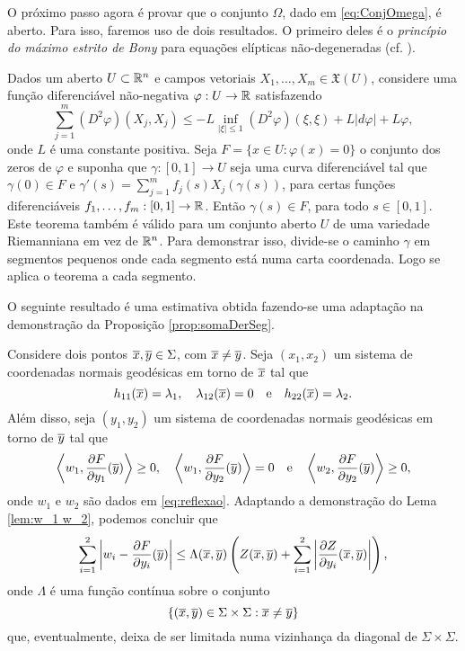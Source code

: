 O pr\'oximo passo agora \'e provar que o conjunto $\Omega$,
dado em \eqref{eq:ConjOmega}, \'e aberto. Para isso, faremos
uso de dois resultados. O primeiro deles \'e o {\em princ\'ipio
do m\'aximo estrito de Bony} para equa\c c\~oes el\'ipticas 
n\~ao-degeneradas (cf. \cite[Corollary 9.7]{Brendle2010}).

\begin{teorema} \label{teo:bony}
Dados um aberto $U\subset\mathbb{R}^n$ e campos vetoriais 
$X_1,\ldots,X_m\in\mathfrak{X}(U)$, considere uma fun\c c\~ao
diferenci\'avel n\~ao-negativa $\varphi:U\to\mathbb{R}$ satisfazendo
\begin{equation}\label{eq:bony}
\sum_{j=1}^{m} (D^2 \varphi)(X_j,X_j) \leq -L \inf_{|\xi| \leq 1} 
(D^2 \varphi)(\xi,\xi) + L |d \varphi| + L \varphi,
\end{equation}
onde $L$ é uma constante positiva. Seja $F=\{x\in U:\varphi(x)=0\}$
o conjunto dos zeros de $\varphi$ e suponha que $\gamma:[0,1]\to U$
seja uma curva diferenciável tal que $\gamma(0)\in F$ e 
$\gamma'(s) = \displaystyle\sum_{j=1}^{m} f_j(s) X_j(\gamma(s))$, para certas
funções diferenciáveis $f_1,\ldots,f_m:[0,1]\to\mathbb{R}$. Então 
$\gamma(s)\in F$, para todo $s\in[0,1]$.
Este teorema também é válido para um conjunto aberto $U$ de uma variedade Riemanniana em vez de $\mathbb{R}^n$. Para demonstrar isso, divide-se o caminho $\gamma$ em segmentos pequenos onde cada segmento está numa carta coordenada. Logo se aplica o teorema a cada segmento.
\end{teorema}

O seguinte resultado \'e uma estimativa obtida fazendo-se uma
adapta\c c\~ao na demonstra\c c\~ao da Proposi\c c\~ao
\ref{prop:somaDerSeg}.

Considere dois pontos $\overline{x},\overline{y}\in\Sigma$, com $\overline{x}\neq\overline{y}$. Seja
$(x_1,x_2)$ um sistema de coordenadas normais geod\'esicas em
torno de $\overline{x}$ tal que
\[
h_{11}(\overline{x})=\lambda_1, \quad \lambda_{12}(\overline{x})=0
\quad\mbox{e}\quad h_{22}(\overline{x})=\lambda_2. 
\]
Al\'em disso, seja $(y_1,y_2)$ um sistema de coordenadas normais 
geod\'esicas em torno de $\overline{y}$ tal que
\begin{equation*}
\left\langle w_1, \frac{\partial F}{\partial y_1}(\overline{y}) \right\rangle \geq 0, 
\quad 
\left\langle w_1, \frac{\partial F}{\partial y_2}(\overline{y}) \right\rangle = 0 
\quad \text{e} \quad 
\left\langle w_2, \frac{\partial F}{\partial y_2}(\overline{y}) \right\rangle \geq 0,
\end{equation*}
onde $w_1$ e $w_2$ s\~ao dados em \eqref{eq:reflexao}. Adaptando
a demonstra\c c\~ao do Lema \ref{lem:w_1 w_2}, podemos concluir
que
\begin{equation}\label{eq:Gamma-ineq}
	\sum_{i=1}^2\left| w_i-\frac{\partial F}{\partial y_i}(\overline{y})\right| \leq
	\Lambda(\overline{x},\overline{y})\left(Z(\overline{x},\overline{y})+\sum_{i=1}^2
	\left|\frac{\partial Z}{\partial y_i}(\overline{x},\overline{y})\right|\right),
\end{equation}
onde $\Lambda$ \'e uma fun\c c\~ao cont\'inua sobre o conjunto
\[
\{(\overline{x},\overline{y})\in\Sigma\times\Sigma:\overline{x}\neq\overline{y}\}
\]
que, eventualmente, deixa de ser limitada numa vizinhan\c ca
da diagonal de $\Sigma\times\Sigma$. 

